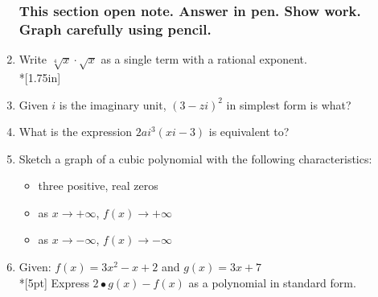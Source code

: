 \documentclass[12pt, oneside]{article}
\begin{document}
\begin{enumerate}
\newpage

\subsubsection*{\textnormal{This section open note. Answer in pen. Show work. Graph carefully using pencil.}}


\item Write $\sqrt[4]x \cdot \sqrt{x}$ as a single term with a rational exponent. %
\\*[1.75in]


\item Given $i$ is the imaginary unit, $(3-zi)^2$ in simplest form is what? \\[2.5in]%

\item What is the expression $2ai^3(xi-3)$ is equivalent to?  %


\newpage
\item Sketch a graph of a cubic polynomial with the following characteristics:
\begin{itemize}
\item three positive, real zeros
\item as $x \rightarrow + \infty$, $f(x) \rightarrow + \infty$
\item as $x \rightarrow - \infty$, $f(x) \rightarrow - \infty$
\end{itemize}
\begin{center}
\end{center} %

\item Given: $f(x)=3x^2- x + 2$ and $g(x)=3x+7$\\*[5pt]
Express $2 \bullet g(x) - f(x)$ as a polynomial in standard form. \\[3in] %


\end{enumerate}
\end{document}
